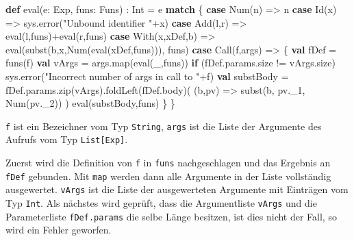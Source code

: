 \documentclass[]{article}
\newenvironment{Shaded}{}{}
\newcommand{\FunctionTok}[1]{\textcolor[rgb]{0.02,0.16,0.49}{#1}}
\newcommand{\KeywordTok}[1]{\textcolor[rgb]{0.00,0.44,0.13}{\textbf{#1}}}
\newcommand{\NormalTok}[1]{#1}
\newcommand{\StringTok}[1]{\textcolor[rgb]{0.25,0.44,0.63}{#1}}
\begin{document}
\begin{Shaded}
\begin{Highlighting}[]
\KeywordTok{def} \FunctionTok{eval}\NormalTok{(e: Exp, funs: Funs) : Int = e }\KeywordTok{match}\NormalTok{ \{}
  \KeywordTok{case} \FunctionTok{Num}\NormalTok{(n) =\textgreater{} n}
  \KeywordTok{case} \FunctionTok{Id}\NormalTok{(x) =\textgreater{} sys.}\FunctionTok{error}\NormalTok{(}\StringTok{"Unbound identifier "}\NormalTok{+x)}
  \KeywordTok{case} \FunctionTok{Add}\NormalTok{(l,r) =\textgreater{} }\FunctionTok{eval}\NormalTok{(l,funs)+}\FunctionTok{eval}\NormalTok{(r,funs)}
  \KeywordTok{case} \FunctionTok{With}\NormalTok{(x,xDef,b) =\textgreater{} }\FunctionTok{eval}\NormalTok{(}\FunctionTok{subst}\NormalTok{(b,x,}\FunctionTok{Num}\NormalTok{(}\FunctionTok{eval}\NormalTok{(xDef,funs))), funs)}
  \KeywordTok{case} \FunctionTok{Call}\NormalTok{(f,args) =\textgreater{} \{}
    \KeywordTok{val}\NormalTok{ fDef = }\FunctionTok{funs}\NormalTok{(f)}
    \KeywordTok{val}\NormalTok{ vArgs = args.}\FunctionTok{map}\NormalTok{(}\FunctionTok{eval}\NormalTok{(\_,funs))}
    \KeywordTok{if}\NormalTok{ (fDef.}\FunctionTok{params}\NormalTok{.}\FunctionTok{size}\NormalTok{ != vArgs.}\FunctionTok{size}\NormalTok{)}
\NormalTok{      sys.}\FunctionTok{error}\NormalTok{(}\StringTok{"Incorrect number of args in call to "}\NormalTok{+f)}
    \KeywordTok{val}\NormalTok{ substBody = fDef.}\FunctionTok{params}\NormalTok{.}\FunctionTok{zip}\NormalTok{(vArgs).}\FunctionTok{foldLeft}\NormalTok{(fDef.}\FunctionTok{body}\NormalTok{)(}
\NormalTok{      (b,pv) =\textgreater{} }\FunctionTok{subst}\NormalTok{(b, pv.}\FunctionTok{\_1}\NormalTok{, }\FunctionTok{Num}\NormalTok{(pv.}\FunctionTok{\_2}\NormalTok{))}
\NormalTok{    )}
    \FunctionTok{eval}\NormalTok{(substBody,funs)}
\NormalTok{  \}}
\NormalTok{\}}
\end{Highlighting}
\end{Shaded}

\texttt{f} ist ein Bezeichner vom Typ \texttt{String}, \texttt{args} ist
die Liste der Argumente des Aufrufs vom Typ \texttt{List{[}Exp{]}}.

Zuerst wird die Definition von \texttt{f} in \texttt{funs}
nachgeschlagen und das Ergebnis an \texttt{fDef} gebunden. Mit
\texttt{map} werden dann alle Argumente in der Liste vollständig
ausgewertet. \texttt{vArgs} ist die Liste der ausgewerteten Argumente
mit Einträgen vom Typ \texttt{Int}. Als nächstes wird geprüft, dass die
Argumentliste \texttt{vArgs} und die Parameterliste \texttt{fDef.params}
die selbe Länge besitzen, ist dies nicht der Fall, so wird ein Fehler
geworfen.
\end{document}
